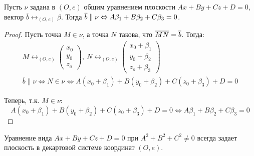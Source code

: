 \begin{proposition}
	Пусть $\nu$ задана в $(O, e)$ общим уравнением плоскости $Ax+By+Cz+D=0$, вектор $\overline{b} \leftrightarrow_{(O, e)} \beta$. Тогда $\overline{b} \hm{\parallel} \nu \Leftrightarrow A\beta_1 + B\beta_2 + C\beta_3 = 0$.
\end{proposition}

\begin{proof}
	Пусть точка $M \in \nu$, а точка $N$ такова, что $\overline{MN} \hm{=} \overline{b}$. Тогда:
	\begin{gather*}
	M \leftrightarrow_{(O, e)}
	\begin{pmatrix}
	x_0\\y_0\\z_o
	\end{pmatrix},~
	N \leftrightarrow_{(O, e)}
	\begin{pmatrix}
	x_0 + \beta_1\\y_0 + \beta_2\\z_o+\beta_3
	\end{pmatrix}\\
	\overline{b} \parallel \nu \Leftrightarrow N \in \nu \Leftrightarrow A(x_0 + \beta_1) + B(y_0 + \beta_2) + C(z_0 + \beta_3) + D = 0
	\end{gather*}
	
	Теперь, т.\:к. $M \in \nu$:
	\[A(x_0 + \beta_1) + B(y_0 + \beta_2) + C(z_0 + \beta_3) + D = 0 \Leftrightarrow A\beta_1 + B\beta_2 + C\beta_3= 0\]
\end{proof}

\begin{proposition}
	Уравнение вида $Ax+By+Cz+D=0$ при $A^2+B^2+C^2\ne0$ всегда задает плоскость в декартовой системе координат $(O, e)$.
\end{proposition}


